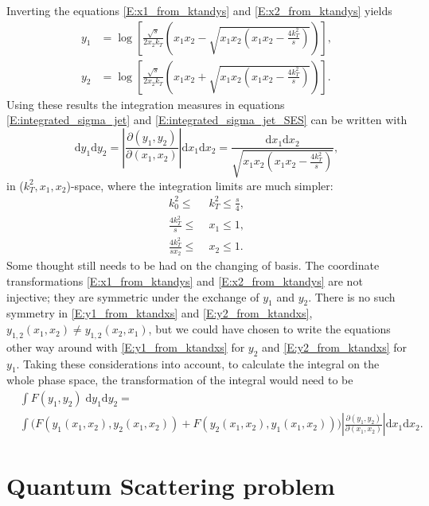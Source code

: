 \documentclass[a4paper, twoside, english, 12pt]{article}
\begin{document}
Inverting the equations \eqref{E:x1_from_ktandys} and \eqref{E:x2_from_ktandys} yields
\begin{align}
	y_1 &= \log\left[\frac{\sqrt{s}}{2x_2k_T}\left(x_1x_2-\sqrt{x_1x_2\left(x_1x_2-\frac{4k_T^2}{s}\right)}\right)\right] \label{E:y1_from_ktandxs} ,\\[1em]
	y_2 &= \log\left[\frac{\sqrt{s}}{2x_2k_T}\left(x_1x_2+\sqrt{x_1x_2\left(x_1x_2-\frac{4k_T^2}{s}\right)}\right)\right] \label{E:y2_from_ktandxs} . 
\end{align}
Using these results the integration measures in equations \eqref{E:integrated_sigma_jet} and \eqref{E:integrated_sigma_jet_SES} can be written with
\begin{equation}\label{E:integration_measure_transform}
	\text{d}y_1\text{d}y_2 = \left|\frac{\partial(y_1,y_2)}{\partial(x_1,x_2)}\right|\text{d}x_1\text{d}x_2 = \frac{\text{d}x_1\text{d}x_2}{\sqrt{x_1x_2\left(x_1x_2-\frac{4k_T^2}{s}\right)}},
\end{equation}
in ($k_T^2,x_1,x_2$)-space, where the integration limits are much simpler:
\begin{align}
	k_0^2\leq\; &k_T^2 \leq \frac{s}{4} , \\
	\frac{4k_T^2}{s} \leq\; &x_1 \leq 1 ,\\
	\frac{4k_T^2}{sx_2} \leq\; &x_2 \leq 1 .
\end{align}
Some thought still needs to be had on the changing of basis. The coordinate transformations \eqref{E:x1_from_ktandys} and \eqref{E:x2_from_ktandys} are not injective; they are symmetric under the exchange of $y_1$ and $y_2$. There is no such symmetry in \eqref{E:y1_from_ktandxs} and \eqref{E:y2_from_ktandxs}, $y_{1,2}(x_1,x_2)\neq y_{1,2}(x_2,x_1)$, but we could have chosen to write the equations other way around with \eqref{E:y1_from_ktandxs} for $y_2$ and \eqref{E:y2_from_ktandxs} for $y_1$. Taking these considerations into account, to calculate the integral on the whole phase space, the transformation of the integral would need to be
\begin{align}
	&\int F(y_1,y_2)\;\text{d}y_1\text{d}y_2  = \nonumber\\ &\int \Big(F(y_1(x_1,x_2),y_2(x_1,x_2))+F(y_2(x_1,x_2),y_1(x_1,x_2))\Big)\left|\frac{\partial(y_1,y_2)}{\partial(x_1,x_2)}\right|\text{d}x_1\text{d}x_2 .
\end{align}





\section{Quantum Scattering problem}
\end{document}
